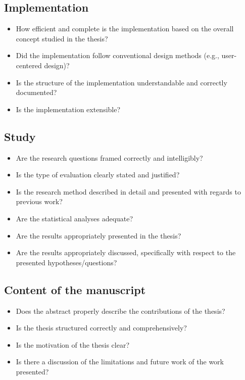 \subsection{Implementation}
\begin{itemize}
    \item How efficient and complete is the implementation based on the overall concept studied in the thesis?
    \item Did the implementation follow conventional design methods (e.g., user-centered design)?
    \item Is the structure of the implementation understandable and correctly documented?
    \item Is the implementation extensible?
\end{itemize}
     
\subsection{Study}
\begin{itemize}
    \item Are the research questions framed correctly and intelligibly?
    \item Is the type of evaluation clearly stated and justified?
    \item Is the research method described in detail and presented with regards to previous work?
    \item Are the statistical analyses adequate?
    \item Are the results appropriately presented in the thesis?
    \item Are the results appropriately discussed, specifically with respect to the presented hypotheses/questions?
\end{itemize}
    
\subsection{Content of the manuscript}
\begin{itemize}
    \item Does the abstract properly describe the contributions of the thesis?
    \item Is the thesis structured correctly and comprehensively?
    \item Is the motivation of the thesis clear?
    \item Is there a discussion of the limitations and future work of the work presented?
\end{itemize}
     
